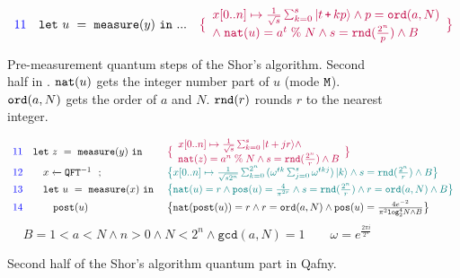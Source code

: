 \begin{figure}[t]
{\[\begin{array}{r l  l}
{}
\\[0.4em]
\textcolor{blue}{11}
& \sexp{u}{\smea{y}}{...}
&
\textcolor{purple}{
\big{\{}
\begin{array}{l}
x[0..n] \mapsto \smch{\frac{1}{\sqrt{s}}}{s}{t\,\splus\,k p} 
\wedge
p = \texttt{ord}(a,N)
\\
\wedge\;
\texttt{nat}(u)=a^{t}\;\%\;N
\wedge
s=\texttt{rnd}(\frac{2^n}{p}) \wedge B
\end{array}
\big{\}}
}
\end{array}
\]
}
\caption{Pre-measurement quantum steps of the Shor's algorithm. Second half in . $\texttt{nat}({u})$ gets the integer number part of $u$ (mode $\texttt{M}$). $\texttt{ord}({a,N})$ gets the order of $a$ and $N$. $\texttt{rnd}({r})$ rounds $r$ to the nearest integer. }
\label{fig:shorqafnyaa}
\end{figure}

\begin{figure}[t]
{\small
\[
\begin{array}{r l  l}
\textcolor{blue}{11}
&
\sexp{z}{\smea{y}}{}
&
\textcolor{purple}{
\big{\{}
\begin{array}{l}
x[0..n] \mapsto \smch{\frac{1}{\sqrt{s}}}{s}{t+jr} 
\wedge
\\
\texttt{nat}(z)=a^{n}\;\%\;N
\wedge
s=\texttt{rnd}(\frac{2^n}{r}) \wedge B
\end{array}
\big{\}}
}
\\[0.4em]
\textcolor{blue}{12}
&
\quad\ssassign{x}{}{\iqft[-1]{}{}}; 
&
\textcolor{teal}{
\big{\{}
x[0..n] \mapsto \smich{\frac{1}{\sqrt{s 2^n}}}{2^n}{(\omega^{tk}\Msum_{j=0}^{s}\omega^{tkj})}{k} 
\wedge
s=\texttt{rnd}(\frac{2^n}{r}) \wedge B
\big{\}}
}
\\[0.4em]
\textcolor{blue}{13}
&
\quad\sexp{u}{\smea{x}}{}
&
\textcolor{teal}{
\big{\{}
\texttt{nat}(u)=r \wedge \texttt{pos}(u)=\frac{4}{\pi ^ {2 r}}
\wedge
s=\texttt{rnd}(\frac{2^n}{r}) \wedge r = \texttt{ord}(a,N) \wedge B
\big{\}}
}
\\[0.4em]
\textcolor{blue}{14}
&
\quad\quad\texttt{post}(u)
&
\big{\{}
\texttt{nat}(\texttt{post}(u))=r \wedge r = \texttt{ord}(a,N) \wedge \texttt{pos}(u)=\frac{4e^{-2}}{\pi^2 \texttt{log}_2^4 N \wedge B}
\big{\}}
\end{array}
\]
}
{\footnotesize
\[
B=1 < a < N \wedge n > 0 \wedge N < 2^n \wedge \texttt{gcd}(a,N)=1
\qquad
\omega=e^{\frac{2\pi i}{2^n}}
\]
}
\caption{Second half of the Shor's algorithm quantum part in Qafny.}
\label{fig:shorqafny2}
\end{figure}


